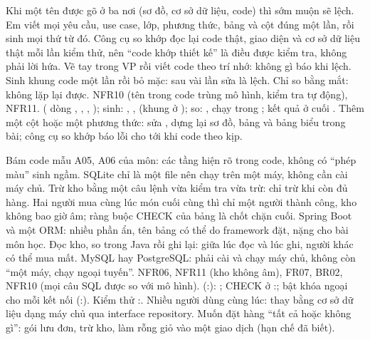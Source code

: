 {Khi một tên được gõ ở ba nơi (sơ đồ, cơ sở dữ liệu, code) thì sớm muộn sẽ lệch. Em viết mọi yêu cầu, use case, lớp, phương thức, bảng và cột đúng một lần, rồi sinh mọi thứ từ đó. Công cụ so khớp đọc lại code thật, giao diện và cơ sở dữ liệu thật mỗi lần kiểm thử, nên ``code khớp thiết kế'' là điều được kiểm tra, không phải lời hứa.}
{Vẽ tay trong VP rồi viết code theo trí nhớ: không gì báo khi lệch. Sinh khung code một lần rồi bỏ mặc: sau vài lần sửa là lệch. Chỉ so bằng mắt: không lặp lại được.}
{NFR10 (tên trong code trùng mô hình, kiểm tra tự động), NFR11.}
{ ( dòng \dongModelReq,  \dongModelAnalysis,  \dongModelDesign,  \dongModelTables); sinh: , ,  (khung ở ); so: , chạy trong ; kết quả ở cuối .}
{Thêm một cột hoặc một phương thức: sửa , dựng lại sơ đồ, bảng và bảng biểu trong bài; công cụ so khớp báo lỗi cho tới khi code theo kịp.}

{Bám code mẫu A05, A06 của môn: các tầng hiện rõ trong code, không có ``phép màu'' sinh ngầm. SQLite chỉ là một file nên chạy trên một máy, không cần cài máy chủ. Trừ kho bằng một câu lệnh vừa kiểm tra vừa trừ: chỉ trừ khi còn đủ hàng. Hai người mua cùng lúc món cuối cùng thì chỉ một người thành công, kho không bao giờ âm; ràng buộc CHECK của bảng là chốt chặn cuối.}
{Spring Boot và một ORM: nhiều phần ẩn, tên bảng có thể do framework đặt, nặng cho bài môn học. Đọc kho, so trong Java rồi ghi lại: giữa lúc đọc và lúc ghi, người khác có thể mua mất. MySQL hay PostgreSQL: phải cài và chạy máy chủ, không còn ``một máy, chạy ngoại tuyến''.}
{NFR06, NFR11 (kho không âm), FR07, BR02, NFR10 (mọi câu SQL được so với mô hình).}
{ (:\dongDecreaseStock): ; CHECK ở :\dongSqlStockCheck; bật khóa ngoại cho mỗi kết nối (:\dongFkPragma). Kiểm thử :\dongTestStock.}
{Nhiều người dùng cùng lúc: thay bằng cơ sở dữ liệu dạng máy chủ qua interface repository. Muốn đặt hàng ``tất cả hoặc không gì'': gói lưu đơn, trừ kho, làm rỗng giỏ vào một giao dịch (hạn chế đã biết).}


